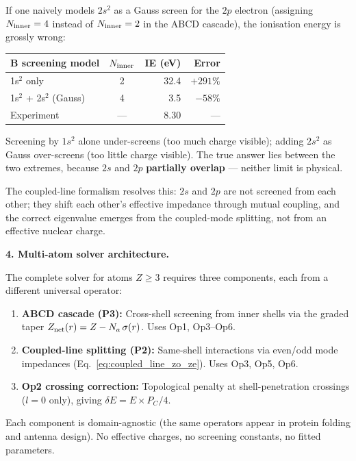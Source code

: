 If one naively models $2s^2$ as a Gauss screen for
the $2p$ electron (assigning $N_{\rm inner} = 4$
instead of $N_{\rm inner} = 2$ in the ABCD cascade),
the ionisation energy is grossly wrong:
\begin{center}
\small
\begin{tabular}{l c r r}
\hline
\textbf{B screening model} &
$N_{\rm inner}$ &
\textbf{IE (eV)} &
\textbf{Error} \\
\hline
1s$^2$ only & 2 & 32.4 & $+291\%$ \\
1s$^2$ + 2s$^2$ (Gauss) & 4 & 3.5 & $-58\%$ \\
Experiment & --- & 8.30 & --- \\
\hline
\end{tabular}
\end{center}
\noindent Screening by $1s^2$ alone under-screens
(too much charge visible); adding $2s^2$ as Gauss
over-screens (too little charge visible).
The true answer lies between the two extremes,
because $2s$ and $2p$ \textbf{partially overlap}
--- neither limit is physical.

The coupled-line formalism resolves this: $2s$ and
$2p$ are not screened from each other; they shift
each other's effective impedance through mutual
coupling, and the correct eigenvalue emerges from
the coupled-mode splitting, not from an effective
nuclear charge.

\noindent\textbf{4. Multi-atom solver architecture.}

The complete solver for atoms $Z \geq 3$ requires
three components, each from a different universal
operator:
\begin{enumerate}
    \item \textbf{ABCD cascade (P3):}
          Cross-shell screening from inner shells
          via the graded taper
          $Z_{\rm net}(r) = Z - N_a\,\sigma(r)$.
          Uses Op1, Op3--Op6.
    \item \textbf{Coupled-line splitting (P2):}
          Same-shell interactions via even/odd
          mode impedances
          (Eq.~\ref{eq:coupled_line_zo_ze}).
          Uses Op3, Op5, Op6.
    \item \textbf{Op2 crossing correction:}
          Topological penalty at shell-penetration
          crossings ($l{=}0$ only), giving
          $\delta E = E \times P_C/4$.
\end{enumerate}
Each component is domain-agnostic (the same
operators appear in protein folding and antenna
design).  No effective charges, no screening
constants, no fitted parameters.

